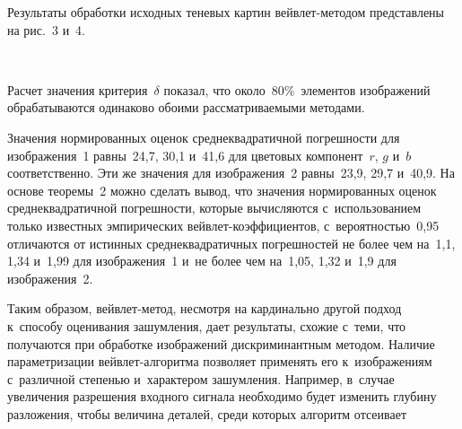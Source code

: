 \begin{multicols}{2}
Результаты обработки исходных теневых картин 
вейв\-лет-ме\-то\-дом представлены на рис.~3 и~4.
\begin{figure*} %
\vspace*{1pt}
 \begin{center}  
\mbox{%
 \epsfxsize=157.815mm
 }
\end{center} 
\vspace*{-9pt}
\label{pic1_w}
\vspace*{12pt}
\end{figure*}

 



Расчет значения критерия~$\delta$ показал, что около~80\%~элементов 
изображений обрабатываются одинаково обоими рассматриваемыми методами.

Значения нормированных оценок средне\-квад\-ра\-тичной погрешности 
для изображения~1 равны~24,7, 30,1 и~41,6 для цветовых компонент~$r$, $g$ и~$b$ 
соответственно. Эти же значения для изображения~2 равны~23,9, 29,7 и~40,9. 
На основе теоремы~2 можно сделать вывод, что значения нормированных оценок 
среднеквадратичной по\-греш\-ности, которые вычисляются с~использованием только 
известных эмпирических вейв\-лет-ко\-эф\-фи\-ци\-ен\-тов, с~вероятностью~0,95 
отличаются от истинных среднеквадратичных погрешностей не более чем на~1,1, 1,34 
и~1,99 для изображения~1 и~не более чем на~1,05, 1,32 и~1,9 для изображения~2.


Таким образом, вейв\-лет-ме\-тод, несмотря на кардинально другой подход 
к~способу оценивания зашумления, дает результаты, схожие с~теми, что получа\-ются 
при обработке изображений дискри\-минантным методом. Наличие параметризации 
вейв\-лет-ал\-го\-рит\-ма позволяет применять его к~изоб\-ра\-же\-ниям с~различной 
степенью и~характером зашумле\-ния. Например, в~случае увеличения разрешения 
входного сигнала необходимо будет изменить глубину разложения, чтобы 
величина деталей, среди которых алгоритм отсеивает\linebreak

\noindent
 \begin{center}  %
 \vspace*{1pt}
 \mbox{%
 \epsfxsize=78mm
 }



\end{center} 


\end{multicols}
